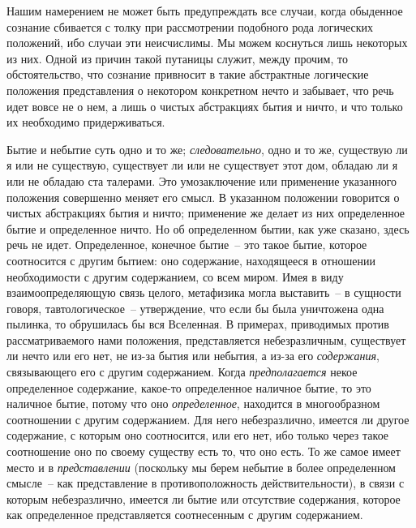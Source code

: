 Нашим намерением не может быть предупреждать все
случаи, когда обыденное сознание сбивается с толку при
рассмотрении подобного рода логических положений, ибо
случаи эти неисчислимы. Мы можем коснуться лишь некоторых
из них. Одной из причин такой путаницы служит,
между прочим, то обстоятельство, что сознание
привносит в такие абстрактные логические положения
представления о некотором конкретном нечто и забывает,
что речь идет вовсе не о нем, а лишь о чистых абстракциях
бытия и ничто, и что только их необходимо придерживаться.

Бытие и небытие суть одно и то же; \emph{следовательно},
одно и то же, существую ли я или не существую, существует
ли или не существует этот дом, обладаю ли я или
не обладаю ста талерами. Это умозаключение или применение
указанного положения совершенно меняет его
смысл. В указанном положении говорится о чистых абстракциях
бытия и ничто; применение же делает из них
определенное бытие и определенное ничто. Но об определенном
бытии, как уже сказано, здесь речь не идет.
Определенное, конечное бытие~-- это такое бытие, которое
соотносится с другим бытием: оно содержание, находящееся
в отношении необходимости с другим содержанием,
со всем миром. Имея в виду взаимоопределяющую
связь целого, метафизика могла выставить~-- в сущности
говоря, тавтологическое~-- утверждение, что если бы была
уничтожена одна пылинка, то обрушилась бы вся Вселенная.
В примерах, приводимых против рассматриваемого
нами положения, представляется небезразличным,
существует ли нечто или его нет, не из-за бытия или
небытия, а из-за его \emph{содержания}, связывающего его
с другим содержанием. Когда \emph{предполагается} некое определенное
содержание, какое-то определенное наличное
бытие, то это наличное бытие, потому что оно \emph{определенное},
находится в многообразном соотношении с другим
содержанием. Для него небезразлично, имеется ли
другое содержание, с которым оно соотносится, или его
нет, ибо только через такое соотношение оно по своему
существу есть то, что оно есть. То же самое имеет место
и в \emph{представлении} (поскольку мы берем небытие в более
определенном смысле~-- как представление в противоположность
действительности), в связи с которым небезразлично,
имеется ли бытие или отсутствие содержания,
которое как определенное представляется соотнесенным
с другим содержанием.

